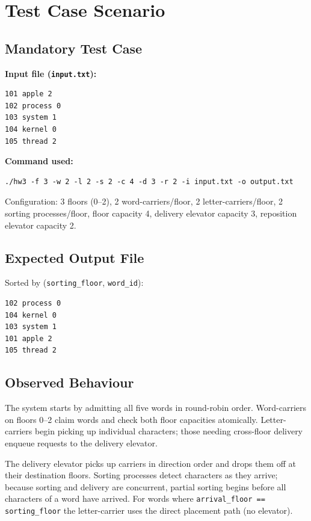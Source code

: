 \documentclass[12pt,a4paper]{article}
\newcommand{\code}[1]{\texttt{\small #1}}
\begin{document}
\section{Test Case Scenario}

\subsection{Mandatory Test Case}

\textbf{Input file (\texttt{input.txt}):}
\begin{lstlisting}[language={},numbers=none]
101 apple 2
102 process 0
103 system 1
104 kernel 0
105 thread 2
\end{lstlisting}

\textbf{Command used:}
\begin{lstlisting}[language={},numbers=none]
./hw3 -f 3 -w 2 -l 2 -s 2 -c 4 -d 3 -r 2 -i input.txt -o output.txt
\end{lstlisting}

Configuration: 3 floors (0--2), 2 word-carriers/floor, 2 letter-carriers/floor,
2 sorting processes/floor, floor capacity 4, delivery elevator capacity 3,
reposition elevator capacity 2.

\subsection{Expected Output File}

Sorted by (\code{sorting\_floor}, \code{word\_id}):
\begin{lstlisting}[language={},numbers=none]
102 process 0
104 kernel 0
103 system 1
101 apple 2
105 thread 2
\end{lstlisting}

\subsection{Observed Behaviour}

The system starts by admitting all five words in round-robin order. Word-carriers
on floors 0--2 claim words and check both floor capacities atomically. Letter-carriers
begin picking up individual characters; those needing cross-floor delivery enqueue
requests to the delivery elevator.

The delivery elevator picks up carriers in direction order and drops them off at
their destination floors. Sorting processes detect characters as they arrive;
because sorting and delivery are concurrent, partial sorting begins before all
characters of a word have arrived. For words where \code{arrival\_floor ==
sorting\_floor} the letter-carrier uses the direct placement path (no elevator).
\end{document}
